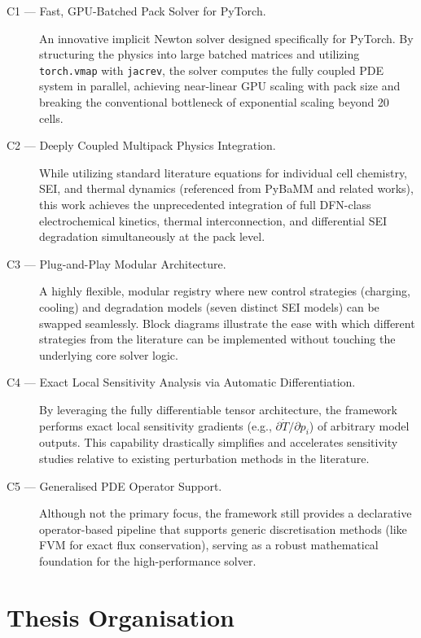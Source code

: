 \begin{description}
  \item[C1 --- Fast, GPU-Batched Pack Solver for PyTorch.] An innovative implicit Newton solver designed specifically for PyTorch. By structuring the physics into large batched matrices and utilizing \texttt{torch.vmap} with \texttt{jacrev}, the solver computes the fully coupled PDE system in parallel, achieving near-linear GPU scaling with pack size and breaking the conventional bottleneck of exponential scaling beyond 20 cells.
  
  \item[C2 --- Deeply Coupled Multipack Physics Integration.] While utilizing standard literature equations for individual cell chemistry, SEI, and thermal dynamics (referenced from PyBaMM and related works), this work achieves the unprecedented integration of full DFN-class electrochemical kinetics, thermal interconnection, and differential SEI degradation simultaneously at the pack level.

  \item[C3 --- Plug-and-Play Modular Architecture.] A highly flexible, modular registry where new control strategies (charging, cooling) and degradation models (seven distinct SEI models) can be swapped seamlessly. Block diagrams illustrate the ease with which different strategies from the literature can be implemented without touching the underlying core solver logic.

  \item[C4 --- Exact Local Sensitivity Analysis via Automatic Differentiation.] By leveraging the fully differentiable tensor architecture, the framework performs exact local sensitivity gradients (e.g., $\partial \dot{T} / \partial p_i$) of arbitrary model outputs. This capability drastically simplifies and accelerates sensitivity studies relative to existing perturbation methods in the literature.
  
  \item[C5 --- Generalised PDE Operator Support.] Although not the primary focus, the framework still provides a declarative operator-based pipeline that supports generic discretisation methods (like FVM for exact flux conservation), serving as a robust mathematical foundation for the high-performance solver.
\end{description}

\section{Thesis Organisation}
\label{sec:organisation}

